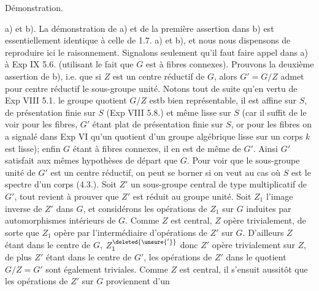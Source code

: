 Démonstration.

a) et b). La démonstration de a) et de la première assertion dans b) est essentiellement identique à celle de 1.7. a) et b), et nous nous dispensons de reproduire ici le raisonnement. Signalons seulement qu'il faut faire appel dans a) à Exp IX 5.6. (utilisant le fait que $G$ est à fibres connexes). Prouvons la deuxième assertion de b), i.e. que si $Z$ est un centre réductif de $G$, alors $G'=G/Z$ admet pour centre réductif le sous-groupe unité. Notons tout de suite qu'en vertu de Exp VIII 5.1. le groupe quotient $G/Z$ estb bien représentable, il est affine sur $S$, de présentation finie sur $S$ (Exp VIII 5.8.) et même lisse sur $S$ (car il suffit de le voir pour les fibres, $G'$ étant plat de présentation finie sur $S$, or pour les fibres  on a signalé dans Exp VI qu'un quotient d'un groupe algébrique lisse sur un corps $k$ est lisse); enfin $G$ étant à fibres connexes, il en est de même de $G'$. Ainsi $G'$ satisfait aux mêmes hypothèses de départ que $G$. Pour voir que le sous-groupe unité de $G'$ est un centre réductif, on peut se borner si on veut au cas où $S$ est le spectre d'un corps (4.3.). Soit $Z'$ un sous-groupe central de type multiplicatif de $G'$, tout revient à prouver que $Z'$ est réduit au groupe unité. Soit $Z_1$  l'image inverse de $Z'$ dans $G$, et considérons les opérations de $Z_1$ sur $G$ induites par automorphismes intérieurs de $G$. Comme $Z$ est central, $Z$ opère  trivialement, de sorte que $Z_1$ opère par l'intermédiaire d'opérations de $Z'$ sur $G$. D'ailleurs $Z$ étant dans le centre de $G$, $Z_1^{\deleted{\unsure{'}}}$ donc $Z'$ opère trivialement sur $Z$, de plus $Z'$ étant dans le centre de $G'$, les opérations de $Z'$ dans le quotient $G/Z=G'$ \unsure{(}sont également triviales. Comme $Z$ est central, il s'ensuit aussitôt que les opérations de $Z'$ sur $G$ proviennent d'un
